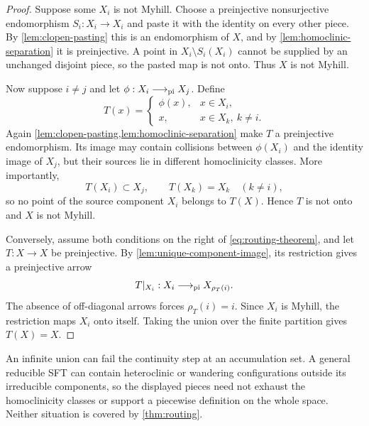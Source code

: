 \begin{proof}
Suppose some $X_i$ is not Myhill.  Choose a preinjective nonsurjective
endomorphism $S_i:X_i\to X_i$ and paste it with the identity on every other
piece.  By \cref{lem:clopen-pasting} this is an endomorphism of $X$, and by
\cref{lem:homoclinic-separation} it is preinjective.  A point in
$X_i\setminus S_i(X_i)$ cannot be supplied by an unchanged disjoint piece, so
the pasted map is not onto.  Thus $X$ is not Myhill.

Now suppose $i\ne j$ and let $\phi:X_i\mathrel{\longrightarrow_{\mathrm{pi}}} X_j$.  Define
\begin{equation}
 T(x)=
 \begin{cases}
 \phi(x),&x\in X_i,\\
 x,&x\in X_k,\ k\ne i.
 \end{cases}
 \label{eq:redirect}
\end{equation}
Again \cref{lem:clopen-pasting,lem:homoclinic-separation} make $T$ a
preinjective endomorphism.  Its image may contain collisions between
$\phi(X_i)$ and the identity image of $X_j$, but their sources lie in
different homoclinicity classes.  More importantly,
\[
 T(X_i)\subset X_j,
 \qquad T(X_k)=X_k\quad(k\ne i),
\]
so no point of the source component $X_i$ belongs to $T(X)$.  Hence $T$ is
not onto and $X$ is not Myhill.

Conversely, assume both conditions on the right of
\eqref{eq:routing-theorem}, and let $T:X\to X$ be preinjective.  By
\cref{lem:unique-component-image}, its restriction gives a preinjective arrow
\[
 T|_{X_i}:X_i\mathrel{\longrightarrow_{\mathrm{pi}}} X_{\rho_T(i)}.
\]
The absence of off-diagonal arrows forces $\rho_T(i)=i$.  Since $X_i$ is
Myhill, the restriction maps $X_i$ onto itself.  Taking the union over the
finite partition gives $T(X)=X$.
\end{proof}

\begin{remark}
\label{rem:routing-scope}
An infinite union can fail the continuity step at an accumulation set.  A
general reducible SFT can contain heteroclinic or wandering configurations
outside its irreducible components, so the displayed pieces need not exhaust
the homoclinicity classes or support a piecewise definition on the whole
space.  Neither situation is covered by \cref{thm:routing}.
\end{remark}

